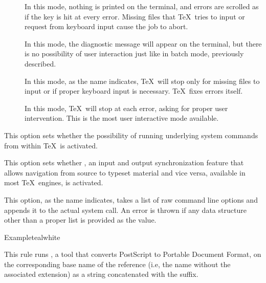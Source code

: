 \begin{description}
\begin{description}
\begin{description}
\item[] In this mode, nothing is printed on the terminal, and errors are scrolled as if the  key is hit at every error. Missing files that \TeX\ tries to input or request from keyboard input cause the job to abort.

\item[] In this mode, the diagnostic message will appear on the terminal, but there is no possibility of user interaction just like in batch mode, previously described.

\item[] In this mode, as the name indicates, \TeX\ will stop only for missing files to input or if proper keyboard input is necessary. \TeX\ fixes errors itself.

\item[] In this mode, \TeX\ will stop at each error, asking for proper user intervention. This is the most user interactive mode available.
\end{description}

\item[\rpsbox{shell}] This option sets whether the possibility of running underlying system commands from within \TeX\ is activated.

\item[\rpsbox{synctex}] This option sets whether , an input and output synchronization feature that allows navigation from source to typeset material and vice versa, available in most \TeX\ engines, is activated.

\item[\abox{options}] This option, as the name indicates, takes a list of raw command line options and appends it to the actual system call. An error is thrown if any data structure other than a proper list is provided as the value.
\end{description}

\begin{codebox}{Example}{teal}{\icnote}{white}
\end{codebox}

\item[\rulebox{ps2pdf}]
This rule runs , a tool that converts PostScript to Portable Document Format, on the corresponding base name of the  reference (i.e, the name without the associated extension) as a string concatenated with the  suffix.


\end{description}
